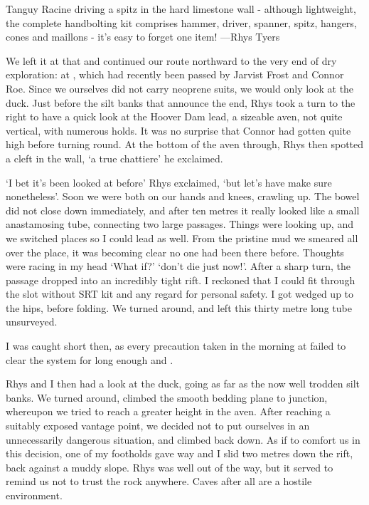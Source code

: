 \begin{marginfigure}
\checkoddpage \ifoddpage \forcerectofloat \else \forceversofloat \fi
\centering
 \caption{Tanguy Racine driving a spitz in the hard limestone wall - although lightweight, the complete handbolting kit comprises hammer, driver, spanner, spitz, hangers, cones and maillons - it's easy to forget one item! ---Rhys Tyers}
 \label{tanguy bolting}
\end{marginfigure}


We left it at that and continued our route northward to the very end of dry exploration: at , which had recently been passed by Jarvist Frost and Connor Roe. Since we ourselves did not carry neoprene suits, we would only look at the duck. Just before the silt banks that announce the end, Rhys took a turn to the right to have a quick look at the Hoover Dam lead, a sizeable aven, not quite vertical, with numerous holds. It was no surprise that Connor had gotten quite high before turning round. At the bottom of the aven through, Rhys then spotted a cleft in the wall, `a true chattiere' he exclaimed.

`I bet it's been looked at before' Rhys exclaimed, `but let's have make sure nonetheless'. Soon we were both on our hands and knees, crawling up. The bowel did not close down immediately, and after ten metres it really looked like a small anastamosing tube, connecting two large passages. Things were looking up, and we switched places so I could lead as well. From the pristine mud we smeared all over the place, it was becoming clear no one had been there before. Thoughts were racing in my head `What if?' `don't die just now!'. After a sharp turn, the passage dropped into an incredibly tight rift. I reckoned that I could fit through the slot without SRT kit and any regard for personal safety. I got wedged up to the hips, before folding. We turned around, and left this thirty metre long tube unsurveyed. 

I was caught short then, as every precaution taken in the morning at  failed to clear the system for long enough and . 

Rhys and I then had a look at the duck, going as far as the now well trodden silt banks. We turned around, climbed the smooth bedding plane to  junction, whereupon we tried to reach a greater height in the aven. After reaching a suitably exposed vantage point, we decided not to put ourselves in an unnecessarily dangerous situation, and climbed back down. As if to comfort us in this decision, one of my footholds gave way and I slid two metres down the rift, back against a muddy slope. Rhys was well out of the way, but it served to remind us not to trust the rock anywhere. Caves after all are a hostile environment. 

